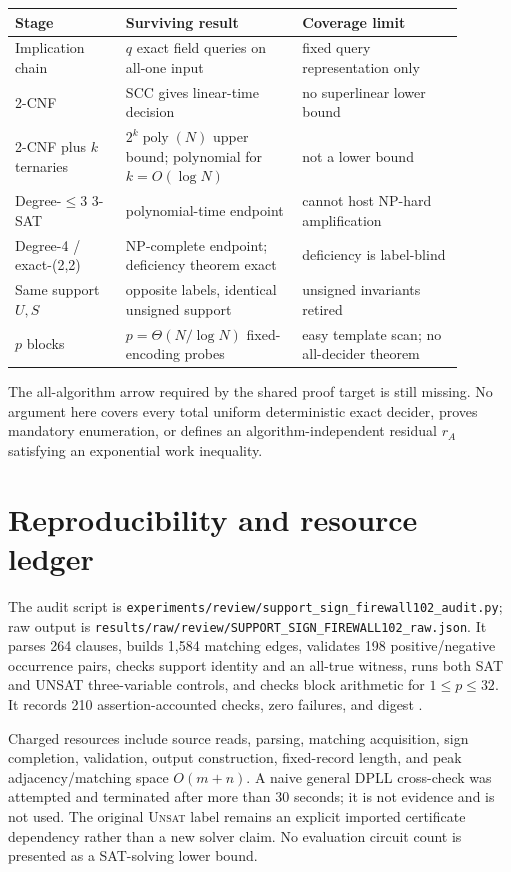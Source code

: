 \documentclass[11pt]{article}
\newcommand{\unsat}{\textsc{Unsat}}
\begin{document}
\begin{center}
\begin{tabular}{p{0.22\linewidth}p{0.35\linewidth}p{0.32\linewidth}}
\toprule
Stage & Surviving result & Coverage limit\\
\midrule
Implication chain & $q$ exact field queries on all-one input & fixed query representation only\\
2-CNF & SCC gives linear-time decision & no superlinear lower bound\\
2-CNF plus $k$ ternaries & $2^k\operatorname{poly}(N)$ upper bound; polynomial for $k=O(\log N)$ & not a lower bound\\
Degree-$\leq3$ 3-SAT & polynomial-time endpoint & cannot host NP-hard amplification\\
Degree-4 / exact-(2,2) & NP-complete endpoint; deficiency theorem exact & deficiency is label-blind\\
Same support $U,S$ & opposite labels, identical unsigned support & unsigned invariants retired\\
$p$ blocks & $p=\Theta(N/\log N)$ fixed-encoding probes & easy template scan; no all-decider theorem\\
\bottomrule
\end{tabular}
\end{center}

The all-algorithm arrow required by the shared proof target is still missing.  No argument
here covers every total uniform deterministic exact decider, proves mandatory enumeration,
or defines an algorithm-independent residual $r_A$ satisfying an exponential work
inequality.

\section{Reproducibility and resource ledger}

The audit script is
\texttt{experiments/review/support\_sign\_firewall102\_audit.py}; raw output is
\texttt{results/raw/review/SUPPORT\_SIGN\_FIREWALL102\_raw.json}.  It parses 264 clauses,
builds 1,584 matching edges, validates 198 positive/negative occurrence pairs, checks
support identity and an all-true witness, runs both SAT and UNSAT three-variable controls,
and checks block arithmetic for $1\leq p\leq32$.  It records 210 assertion-accounted checks,
zero failures, and digest
.

Charged resources include source reads, parsing, matching acquisition, sign completion,
validation, output construction, fixed-record length, and peak adjacency/matching space
$O(m+n)$.  A naive general DPLL cross-check was attempted and terminated after more than
30 seconds; it is not evidence and is not used.  The original \unsat{} label remains an
explicit imported certificate dependency rather than a new solver claim.  No evaluation
circuit count is presented as a SAT-solving lower bound.
\end{document}
